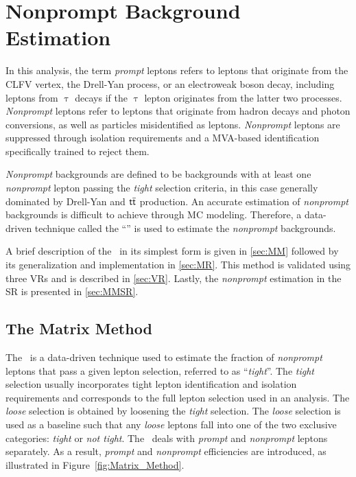 \chapter{Nonprompt Background Estimation}
\label{chap:Nonprompt}

In this analysis, the term \emph{prompt} leptons refers to leptons that originate from the \ac{CLFV} vertex, the Drell-Yan process, or an electroweak boson decay, including leptons from $\uptau$ decays if the $\uptau$ lepton originates from the latter two processes. \emph{Nonprompt} leptons refer to leptons that originate from hadron decays and photon conversions, as well as particles misidentified as leptons. \emph{Nonprompt} leptons are suppressed through isolation requirements and a \ac{MVA}-based identification specifically trained to reject them.

\emph{Nonprompt} backgrounds are defined to be backgrounds with at least one \emph{nonprompt} lepton passing the \emph{tight} selection criteria, in this case generally dominated by Drell-Yan and $\textsf{t}\overline{\textsf{t}}$ production. An accurate estimation of \emph{nonprompt} backgrounds is difficult to achieve through \ac{MC} modeling. Therefore, a data-driven technique called the ``\mm'' \cite{Gillam:2014xua} is used to estimate the \emph{nonprompt} backgrounds. 

A brief description of the \mm~in its simplest form is given in \autoref{sec:MM} followed by its generalization and implementation in \autoref{sec:MR}. This method is validated using three \acp{VR} and is described in \autoref{sec:VR}. Lastly, the \emph{nonprompt} estimation in the \ac{SR} is presented in \autoref{sec:MMSR}.

\section{The Matrix Method}
\label{sec:MM}

The \mm~is a data-driven technique used to estimate the fraction of \emph{nonprompt} leptons that pass a given lepton selection, referred to as ``\emph{tight}''. The \emph{tight} selection usually incorporates tight lepton identification and isolation requirements and corresponds to the full lepton selection used in an analysis. The \emph{loose} selection is obtained by loosening the \emph{tight} selection. The \emph{loose} selection is used as a baseline such that any \emph{loose} leptons fall into one of the two exclusive categories: \emph{tight} or \emph{not tight}. The \mm~deals with \emph{prompt} and \emph{nonprompt} leptons separately. As a result, \emph{prompt} and \emph{nonprompt} efficiencies are introduced, as illustrated in Figure~\ref{fig:Matrix_Method}.

